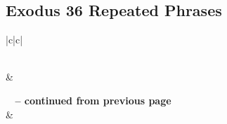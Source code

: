 \subsection{Exodus 36 Repeated Phrases}


\normalsize
 
\begin{center}
\begin{longtable}{|c|c|}
\caption[Exodus 36 Repeated Phrases]{Exodus 36 Repeated Phrases}\label{table:Repeated Phrases Exodus 36} \\
\hline {} &  \\ \hline 
\endfirsthead
 
{{\bfseries \tablename\ \thetable{} -- continued from previous page}} \\  
\hline {} &  \\ \hline 
\endhead
 

\end{longtable}
\end{center}

